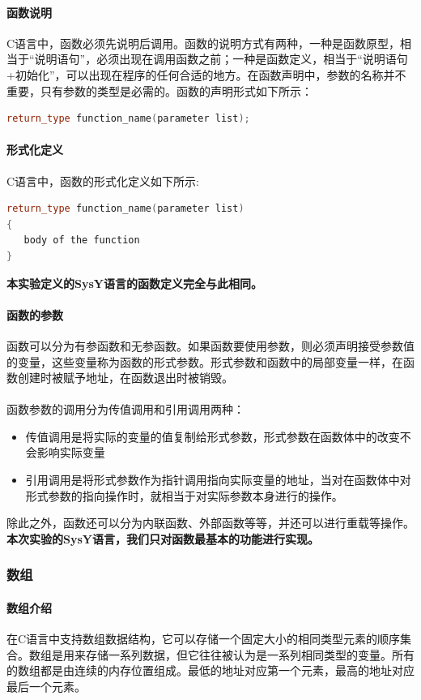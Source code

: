 \documentclass[UTF8,a4paper,10pt]{ctexart}
\begin{document}
\paragraph{函数说明}
C语言中，函数必须先说明后调用。函数的说明方式有两种，一种是函数原型，相当于“说明语句”，必须出现在调用函数之前；一种是函数定义，相当于“说明语句+初始化”，可以出现在程序的任何合适的地方。在函数声明中，参数的名称并不重要，只有参数的类型是必需的。函数的声明形式如下所示：
\begin{lstlisting}[language = c++]
return_type function_name(parameter list);
\end{lstlisting}
\paragraph{形式化定义}
C语言中，函数的形式化定义如下所示:
\begin{lstlisting}[language = c++]
return_type function_name(parameter list)
{
   body of the function
}
\end{lstlisting}
\textbf{本实验定义的SysY语言的函数定义完全与此相同。}
\paragraph{函数的参数}
函数可以分为有参函数和无参函数。如果函数要使用参数，则必须声明接受参数值的变量，这些变量称为函数的形式参数。形式参数和函数中的局部变量一样，在函数创建时被赋予地址，在函数退出时被销毁。\\
\\
函数参数的调用分为传值调用和引用调用两种：
\begin{itemize}
    \item 传值调用是将实际的变量的值复制给形式参数，形式参数在函数体中的改变不会影响实际变量
    \item 引用调用是将形式参数作为指针调用指向实际变量的地址，当对在函数体中对形式参数的指向操作时，就相当于对实际参数本身进行的操作。
\end{itemize}

除此之外，函数还可以分为内联函数、外部函数等等，并还可以进行重载等操作。\textbf{本次实验的SysY语言，我们只对函数最基本的功能进行实现。}

\subsubsection{数组}
\paragraph{数组介绍}
在C语言中支持数组数据结构，它可以存储一个固定大小的相同类型元素的顺序集合。数组是用来存储一系列数据，但它往往被认为是一系列相同类型的变量。所有的数组都是由连续的内存位置组成。最低的地址对应第一个元素，最高的地址对应最后一个元素。
\end{document}
